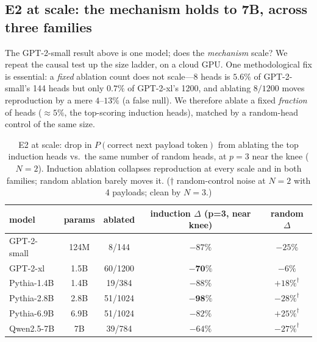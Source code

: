 \documentclass[11pt]{article}
\theoremstyle{plain}
\theoremstyle{definition}
\theoremstyle{remark}
\begin{document}
\subsection{E2 at scale: the mechanism holds to 7B, across three families}\label{sec:e2scale}
The GPT-2-small result above is one model; does the \emph{mechanism} scale? We repeat the
causal test up the size ladder, on a cloud GPU. One methodological fix is essential: a
\emph{fixed} ablation count does not scale---8 heads is $5.6\%$ of GPT-2-small's 144 heads but
only $0.7\%$ of GPT-2-xl's 1200, and ablating $8/1200$ moves reproduction by a mere
$4$--$13\%$ (a false null). We therefore ablate a fixed \emph{fraction} of heads
($\approx\!5\%$, the top-scoring induction heads), matched by a random-head control of the
same size.

\begin{table}[h]
\centering\small
\begin{tabular}{lcccc}
\toprule
model & params & ablated & induction $\Delta$ (p{=}3, near knee) & random $\Delta$ \\
\midrule
GPT-2-small   & 124M & 8/144 & $-87\%$ & $-25\%$ \\
GPT-2-xl      & 1.5B & 60/1200 & $\mathbf{-70\%}$ & $-6\%$ \\
Pythia-1.4B   & 1.4B & 19/384 & $-88\%$ & $+18\%^\dagger$ \\
Pythia-2.8B   & 2.8B & 51/1024 & $\mathbf{-98\%}$ & $-28\%^\dagger$ \\
Pythia-6.9B   & 6.9B & 51/1024 & $-82\%$ & $+25\%^\dagger$ \\
Qwen2.5-7B    & 7B & 39/784 & $-64\%$ & $-27\%^\dagger$ \\
\bottomrule
\end{tabular}
\caption{E2 at scale: drop in $P(\text{correct next payload token})$ from ablating the top
induction heads vs.\ the same number of random heads, at $p{=}3$ near the knee ($N{=}2$).
Induction ablation collapses reproduction at every scale and in both families; random ablation
barely moves it. ($\dagger$ random-control noise at $N{=}2$ with 4 payloads; clean by $N{=}3$.)}
\label{tab:e2scale}
\end{table}
\end{document}
